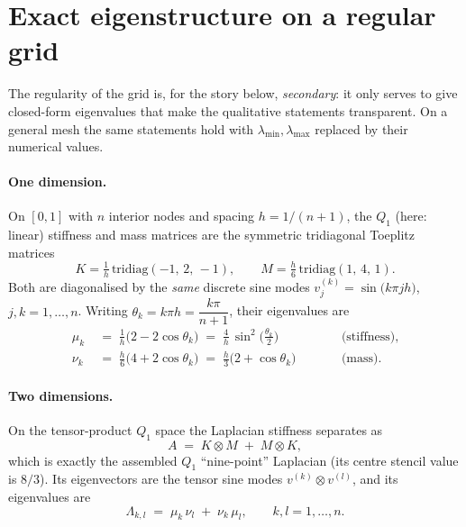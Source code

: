 \documentclass[11pt]{article}
\begin{document}
\section{Exact eigenstructure on a regular grid}

The regularity of the grid is, for the story below, \emph{secondary}: it only serves to
give closed-form eigenvalues that make the qualitative statements transparent. On a general
mesh the same statements hold with $\lambda_{\min},\lambda_{\max}$ replaced by their
numerical values.

\paragraph{One dimension.}
On $[0,1]$ with $n$ interior nodes and spacing $h=1/(n+1)$, the $Q_1$ (here: linear)
stiffness and mass matrices are the symmetric tridiagonal Toeplitz matrices
\begin{equation}
  K = \tfrac{1}{h}\,\mathrm{tridiag}(-1,\,2,\,-1),
  \qquad
  M = \tfrac{h}{6}\,\mathrm{tridiag}(1,\,4,\,1).
\end{equation}
Both are diagonalised by the \emph{same} discrete sine modes
$v^{(k)}_j = \sin\!\big(k\pi j h\big)$, $j,k=1,\dots,n$. Writing
$\theta_k = k\pi h = \dfrac{k\pi}{n+1}$, their eigenvalues are
\begin{align}
  \mu_k \;&=\; \frac{1}{h}\big(2 - 2\cos\theta_k\big)
            \;=\; \frac{4}{h}\,\sin^2\!\Big(\frac{\theta_k}{2}\Big)
            \qquad&&\text{(stiffness)},\\[2pt]
  \nu_k \;&=\; \frac{h}{6}\big(4 + 2\cos\theta_k\big)
            \;=\; \frac{h}{3}\big(2 + \cos\theta_k\big)
            \qquad&&\text{(mass)}.
\end{align}

\paragraph{Two dimensions.}
On the tensor-product $Q_1$ space the Laplacian stiffness separates as
\begin{equation}
  A \;=\; K\otimes M \;+\; M\otimes K ,
\end{equation}
which is exactly the assembled $Q_1$ ``nine-point'' Laplacian (its centre stencil value is
$8/3$). Its eigenvectors are the tensor sine modes $v^{(k)}\otimes v^{(l)}$, and its
eigenvalues are
\begin{equation}
  \boxed{\;
  \Lambda_{k,l} \;=\; \mu_k\,\nu_l \;+\; \nu_k\,\mu_l ,
  \qquad k,l=1,\dots,n .
  \;}
  \label{eq:eig2d}
\end{equation}
\end{document}
